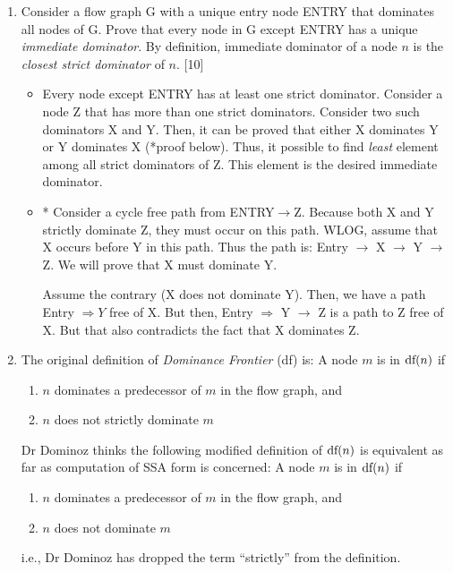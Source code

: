 \documentclass[12pt]{article}
\newcommand{\answer}[1]{{{\blue #1}}}
\begin{document}
\begin{enumerate}
\item Consider a flow graph G with a unique entry node ENTRY that
  dominates all nodes of G. Prove that every node in G except
  ENTRY has a unique {\em immediate dominator}.  By definition,
  immediate dominator of a node $n$ is the {\em closest strict
    dominator} of $n$.  \hfill[10] \answer{
  \begin{itemize}
  \item Every node except ENTRY has at least one strict
    dominator. Consider a node Z that has more than one strict
    dominators. Consider two such dominators X and Y. Then, it
    can be proved that either X dominates Y or Y dominates X
    (*proof below). Thus, it possible to find {\em least} element
    among all strict dominators of Z. This element is the desired
    immediate dominator.
  \item * Consider a cycle free path from
    ENTRY$\rightarrow$Z. Because both X and Y strictly
    dominate Z, they must occur on this path. WLOG, assume
    that X occurs before Y in this path.  Thus the path is:
    Entry $\rightarrow$ X $\rightarrow$ Y $\rightarrow$ Z. We
    will prove that X must dominate Y.

    Assume the contrary (X does not dominate Y). Then, we
    have a path Entry $\Rightarrow Y$ free of X. But then,
    Entry $\Rightarrow$ Y $\rightarrow$ Z is a path to Z free
    of X. But that also contradicts the fact that X dominates
    Z.
  \end{itemize}
}

\newcommand{\df}{\mbox{\rm df}}
\item The original definition of {\em Dominance Frontier} (\df) is:
A node $m$ is in $\df(n)$ if
\begin{enumerate}
\item $n$ dominates a predecessor of $m$ in the flow graph, and
\item $n$ does not strictly dominate $m$
\end{enumerate}
Dr Dominoz thinks the following modified definition of $\df(n)$ is equivalent as far as computation of SSA form is concerned: A node $m$ is in $\df(n)$ if
\begin{enumerate}
\item $n$ dominates a predecessor of $m$ in the flow graph, and
\item $n$ does not dominate $m$
\end{enumerate}
i.e., Dr Dominoz has dropped the term ``strictly'' from the
definition.


\end{enumerate}
\end{document}

